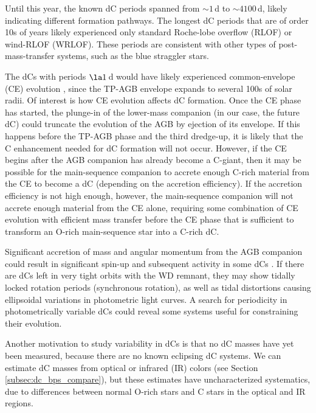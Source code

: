 \documentclass[twocolumn]{aastex631}
\begin{document}
Until this year, the known dC periods spanned from $\sim1$\,d to $\sim4100$\,d, likely indicating different formation pathways. The longest dC periods that are of order 10s of years likely experienced only standard Roche-lobe overflow (RLOF) or wind-RLOF (WRLOF). These periods are consistent with other types of post-mass-transfer systems, such as the blue straggler stars. 

The dCs with periods $\la1$\,d would have likely experienced common-envelope (CE) evolution \citep{Paczynski1976, Ivanova2013}, since the TP-AGB envelope expands to several 100s of solar radii. Of interest is how CE evolution affects dC formation.  Once the CE phase has started, the plunge-in of the lower-mass companion (in our case, the future dC) could truncate the evolution of the AGB by ejection of its envelope. If this happens before the TP-AGB phase and the third dredge-up, it is likely that the C enhancement needed for dC formation will not occur. However, if the CE begins after the AGB companion has already become a C-giant, then it may be possible for the main-sequence companion to accrete enough C-rich material from the CE to become a dC (depending on the accretion efficiency). If the accretion efficiency is not high enough, however, the main-sequence companion will not accrete enough material from the CE alone, requiring some combination of CE evolution with efficient mass transfer before the CE phase that is sufficient to transform an O-rich main-sequence star into a C-rich dC. 

Significant accretion of mass and angular momentum from the AGB companion could result in significant spin-up and subsequent activity in some dCs \citep{Green2019}.  If there are dCs left in very tight orbits with the WD remnant, they may show tidally locked rotation periods (synchronous rotation), as well as tidal distortions causing ellipsoidal variations in photometric light curves. A search for periodicity in photometrically variable dCs could reveal some systems useful for constraining their evolution.

Another motivation to study variability in dCs is that no dC masses have yet been measured, because there are no known eclipsing dC systems. We can estimate dC masses from optical or infrared (IR) colors (see Section \ref{subsec:dc_bps_compare}), but these estimates have uncharacterized systematics, due to differences between normal O-rich stars and C stars in the optical and IR regions. 
\end{document}
